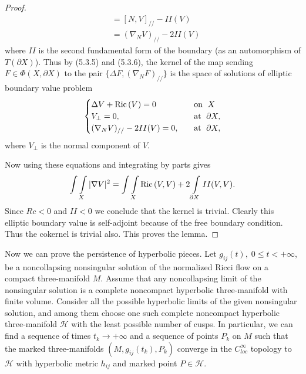 \begin{proof}
\begin{align}
&  = [N,V]_{//} - II(V) \nonumber\\
&  = (\nabla_NV)_{//} - 2II(V) \nonumber
\end{align} %
where $II$ is the second fundamental form of the boundary (as an
automorphism of $T(\partial X)$). Thus by (5.3.5) and (5.3.6), the
kernel of the map sending $F\in \Phi(X,\partial X)$ to the pair
$\{\Delta F,(\nabla_NF)_{//}\}$ is the space of solutions of
elliptic boundary value problem \begin{equation}
\begin{cases}
\Delta V+\Ric(V)=0 &\quad \text{on }\;X\\
V_{\bot}=0,&\quad \text{at }\;\partial X,\\
(\nabla_NV)_{//}-2II(V)=0,&\quad \text{at } \;\partial X,
\end{cases} %
\end{equation} where $V_\bot$ is the normal component of $V$.

Now using these equations and integrating by parts gives
$$
\int\int\limits_X|\nabla V|^2
=\int\int\limits_X{\rm Ric}\,(V,V)+2\int\limits_{\partial X}II(V,V).
$$
Since $Rc<0$ and $II<0$ we conclude that the kernel is trivial.
Clearly this elliptic boundary value is self-adjoint because of
the free boundary condition. Thus the cokernel is trivial also.
This proves the lemma.
\end{proof}

Now we can prove the persistence of hyperbolic pieces. Let
$g_{ij}(t),\;0\le t< +\infty$, be a noncollapsing nonsingular
solution of the normalized Ricci flow on a compact three-manifold
$M$. Assume that any noncollapsing limit of the nonsingular
solution is a complete noncompact hyperbolic three-manifold with
finite volume. Consider all the possible hyperbolic limits of the
given nonsingular solution, and among them choose one such
complete noncompact hyperbolic three-manifold $\mathcal{H}$ with
the least possible number of cusps. In particular, we can find a
sequence of times $t_k\rightarrow +\infty$ and a sequence of
points $P_k$ on $M$ such that the marked three-manifolds
$(M,g_{ij}(t_k),P_k)$ converge in the $C^\infty_{loc}$ topology to
$\mathcal{H}$ with hyperbolic metric $h_{ij}$ and marked point
$P\in \mathcal{H}$.

